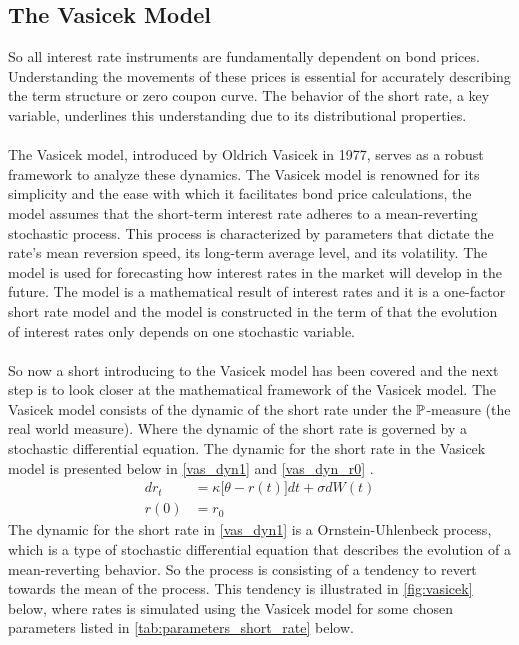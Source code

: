 \subsection{The Vasicek Model}
So all interest rate instruments are fundamentally dependent on bond prices. Understanding the movements of 
these prices is essential for accurately describing the term structure or zero coupon curve. The behavior 
of the short rate, a key variable, underlines this understanding due to its distributional properties.
\\\\
The Vasicek model, introduced by Oldrich Vasicek in 1977, serves as a robust framework to analyze these dynamics.
The Vasicek model is renowned for its simplicity and the ease with which it facilitates bond price calculations, 
the model assumes that the short-term interest rate adheres to a mean-reverting stochastic process. This process is characterized 
by parameters that dictate the rate's mean reversion speed, its long-term average level, and its volatility.
The model is used for forecasting how interest rates in the market will develop in the future. The model is a
mathematical result of interest rates and it is a one-factor short rate model and the model is constructed in the 
term of that the evolution of interest rates only depends on one stochastic variable.
\\\\
So now a short introducing to the Vasicek model has been covered and the next step is to look closer at the 
mathematical framework of the Vasicek model. The Vasicek model consists of the dynamic of the short rate under the $\mathbb{P}$-measure
(the real world measure). Where the dynamic of the short rate is governed by a stochastic differential equation. 
The dynamic for the short rate in the Vasicek model is presented below in \autoref{vas_dyn1} and \autoref{vas_dyn_r0} \cite{Bjork}.
\begin{align}
    d r_t &= \kappa \Big[\theta -r(t)\Big] dt + \sigma d W(t) \label{vas_dyn1}\\
    r(0) &= r_0 \label{vas_dyn_r0}
\end{align}
The dynamic for the short rate in \autoref{vas_dyn1} is a Ornstein-Uhlenbeck process, which is a type of stochastic 
differential equation that describes the evolution of a mean-reverting behavior. So the process is consisting of a 
tendency to revert towards the mean of the process. This tendency is illustrated in \autoref{fig:vasicek} below, where 
 rates is simulated using the Vasicek model for some chosen parameters listed in \autoref{tab:parameters_short_rate} below. 
